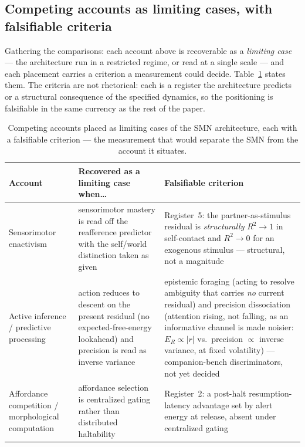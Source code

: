 \documentclass{article}
\begin{document}
\subsection{Competing accounts as limiting cases, with falsifiable
criteria}\label{sec:limiting-cases}

Gathering the comparisons: each account above is recoverable as a
\emph{limiting case} --- the architecture run in a restricted regime, or
read at a single scale --- and each placement carries a criterion a
measurement could decide.  Table~\ref{tab:limiting-cases} states them.
The criteria are not rhetorical: each is a register the architecture
predicts or a structural consequence of the specified dynamics, so the
positioning is falsifiable in the same currency as the rest of the paper.

\begin{table}[!htbp]
\centering
\small
\caption{Competing accounts placed as limiting cases of the SMN
architecture, each with a falsifiable criterion --- the measurement that
would separate the SMN from the account it situates.}
\label{tab:limiting-cases}
\begin{tabularx}{\linewidth}{@{}p{2.5cm} X X@{}}
\toprule
\textbf{Account} & \textbf{Recovered as a limiting case when\ldots} &
\textbf{Falsifiable criterion} \\
\midrule
Sensorimotor enactivism &
sensorimotor mastery is read off the reafference predictor with the
self/world distinction taken as given &
Register~5: the partner-as-stimulus residual is \emph{structurally}
$R^2\!\to\!1$ in self-contact and $R^2\!\to\!0$ for an exogenous
stimulus --- structural, not a magnitude \\
\addlinespace[2pt]
Active inference / predictive processing &
action reduces to descent on the present residual (no expected-free-energy
lookahead) and precision is read as inverse variance &
epistemic foraging (acting to resolve ambiguity that carries \emph{no}
current residual) and precision dissociation (attention rising, not
falling, as an informative channel is made noisier: $E_R\!\propto\!|r|$
vs.\ precision $\propto$ inverse variance, at fixed volatility) --- companion-bench
discriminators, not yet decided \\
\addlinespace[2pt]
Affordance competition / morphological computation &
affordance selection is centralized gating rather than distributed
haltability &
Register~2: a post-halt resumption-latency advantage set by alert energy
at release, absent under centralized gating \\

\end{tabularx}
\end{table}
\end{document}
